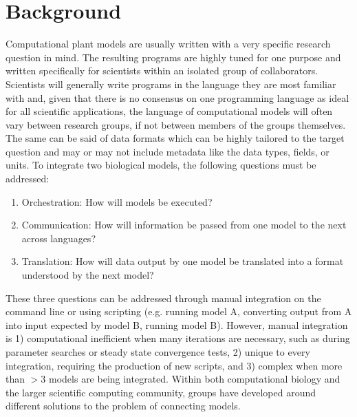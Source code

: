 \documentclass[journal]{IEEEtran}
\begin{document}
\section{Background}\label{S:background}
%
Computational plant models are usually written with a very specific research question in mind. The resulting programs are highly tuned for one purpose and written specifically for scientists within an isolated group of collaborators. Scientists will generally write programs in the language they are most familiar with and, given that there is no consensus on one programming language as ideal for all scientific applications, the language of computational models will often vary between research groups, if not between members of the groups themselves. The same can be said of data formats which can be highly tailored to the target question and may or may not include metadata like the data types, fields, or units. To integrate two biological models, the following questions must be addressed:
%
\begin{enumerate}
	\item Orchestration: How will models be executed?
	\item Communication: How will information be passed from one model to the next across languages?
	\item Translation: How will data output by one model be translated into a format understood by the next model?
\end{enumerate}

These three questions can be addressed through manual integration on the command line or using scripting (e.g. running model A, converting output from A into input expected by model B, running model B). However, manual integration is 1) computational inefficient when many iterations are necessary, such as during parameter searches or steady state convergence tests, 2) unique to every integration, requiring the production of new scripts, and 3) complex when more than $>3$ models are being integrated. Within both computational biology and the larger scientific computing community, groups have developed around different solutions to the problem of connecting models.

\end{document}

